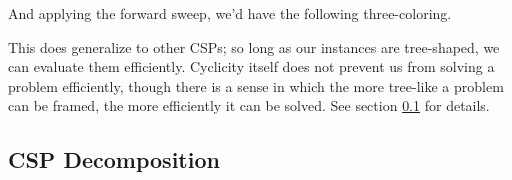 \begin{center}
\end{center}

And applying the forward sweep, we'd have the following three-coloring.

\begin{center}
\end{center}

This does generalize to other CSPs; so long as our instances are tree-shaped, we can evaluate them efficiently. Cyclicity itself does not prevent us from solving a problem efficiently, though there is a sense in which the more tree-like a problem can be framed, the more efficiently it can be solved. See section \ref{sec:csp-decomposition} for details.

\subsection{CSP Decomposition}\label{sec:csp-decomposition}

